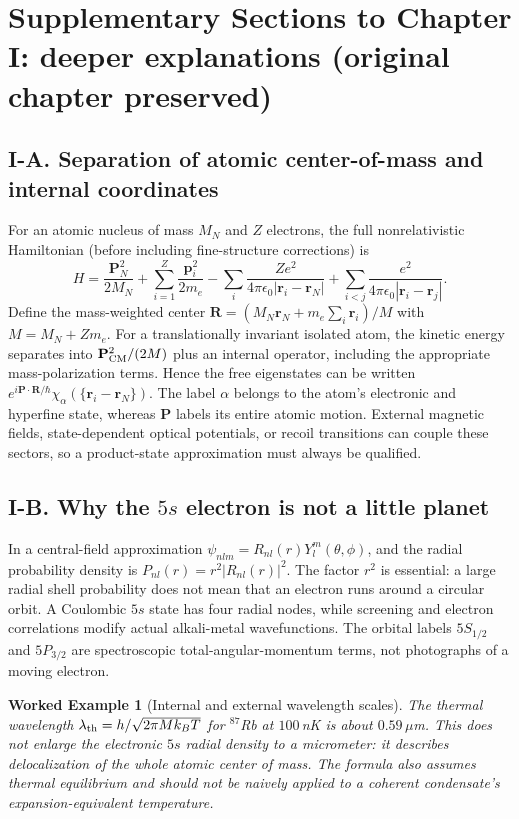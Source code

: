 \documentclass[11pt,a4paper]{article}
\newtheorem{example}{Worked Example}
\begin{document}
\clearpage
\section*{Supplementary Sections to Chapter I: deeper explanations (original chapter preserved)}
\subsection*{I-A. Separation of atomic center-of-mass and internal coordinates}
For an atomic nucleus of mass $M_N$ and $Z$ electrons, the full nonrelativistic Hamiltonian (before including fine-structure corrections) is
\begin{equation}
H=\frac{\mathbf P_N^2}{2M_N}+\sum_{i=1}^{Z}\frac{\mathbf p_i^2}{2m_e}
-\sum_i\frac{Ze^2}{4\pi\epsilon_0|\mathbf r_i-\mathbf r_N|}
+\sum_{i<j}\frac{e^2}{4\pi\epsilon_0|\mathbf r_i-\mathbf r_j|}.
\end{equation}
Define the mass-weighted center $\mathbf R=(M_N\mathbf r_N+m_e\sum_i\mathbf r_i)/M$ with $M=M_N+Zm_e$. For a translationally invariant isolated atom, the kinetic energy separates into $\mathbf P_{\rm CM}^2/(2M)$ plus an internal operator, including the appropriate mass-polarization terms. Hence the free eigenstates can be written $e^{i\mathbf P\cdot\mathbf R/\hbar}\chi_\alpha(\{\mathbf r_i-\mathbf r_N\})$. The label $\alpha$ belongs to the atom's electronic and hyperfine state, whereas $\mathbf P$ labels its entire atomic motion. External magnetic fields, state-dependent optical potentials, or recoil transitions can couple these sectors, so a product-state approximation must always be qualified.
\subsection*{I-B. Why the $5s$ electron is not a little planet}
In a central-field approximation $\psi_{nlm}=R_{nl}(r)Y_l^m(\theta,\phi)$, and the radial probability density is $P_{nl}(r)=r^2|R_{nl}(r)|^2$. The factor $r^2$ is essential: a large radial shell probability does not mean that an electron runs around a circular orbit. A Coulombic $5s$ state has four radial nodes, while screening and electron correlations modify actual alkali-metal wavefunctions. The orbital labels $5S_{1/2}$ and $5P_{3/2}$ are spectroscopic total-angular-momentum terms, not photographs of a moving electron.
\begin{example}[Internal and external wavelength scales]
The thermal wavelength $\lambda_{\rm th}=h/\sqrt{2\pi Mk_BT}$ for $^{87}$Rb at $100\,$nK is about $0.59\,\mu$m. This does not enlarge the electronic $5s$ radial density to a micrometer: it describes delocalization of the whole atomic center of mass. The formula also assumes thermal equilibrium and should not be naively applied to a coherent condensate's expansion-equivalent temperature.
\end{example}
\end{document}

